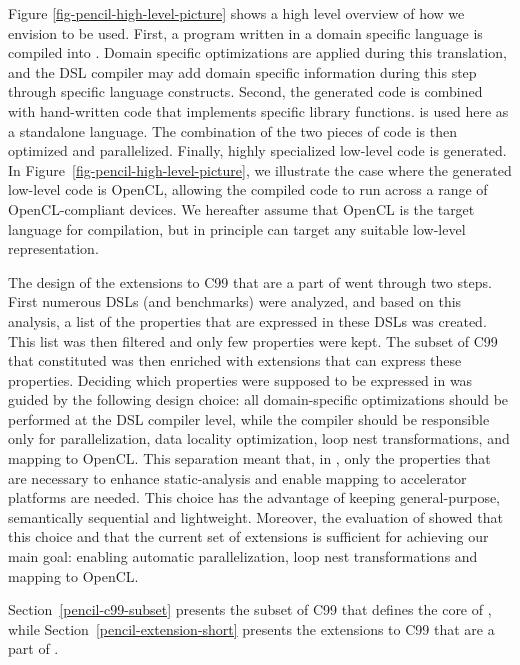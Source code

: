 Figure \ref{fig-pencil-high-level-picture} shows a high level
overview of how we envision \pencil to be used.
First, a program written in a domain
specific language is compiled into \pencil.  Domain specific
optimizations are applied during this translation, and the DSL compiler may
add domain specific information during this step through specific \pencil
language
constructs.  Second, the generated \pencil code is combined with
hand-written \pencil code that implements specific library
functions.  \pencil is used here as a standalone language.  The
combination of the two pieces of code is then optimized and
parallelized.  Finally, 
highly specialized low-level code is generated.
In Figure~\ref{fig-pencil-high-level-picture}, we
illustrate the case where the generated low-level code is OpenCL, 
allowing the compiled code to run across a range of OpenCL-compliant 
devices.  We hereafter assume that OpenCL is the target language for 
\pencil compilation, but in principle \pencil can target any suitable 
low-level representation.

The design of the extensions to C99 that are a part of \pencil went
through two steps.
First numerous DSLs (and benchmarks) were analyzed, and based on this
analysis,  a list of the properties that are expressed in these DSLs
was created.
This list was then filtered and only few properties were kept.
The subset of C99 that constituted \pencil was then enriched with
extensions that can express these properties.
Deciding which properties were supposed to be expressed in \pencil
was guided by the following design choice:
all domain-specific optimizations should be performed at the DSL compiler
level, while the \pencil compiler should be responsible only for parallelization,
data locality optimization, loop nest transformations, and mapping to OpenCL.
This separation meant that, in \pencil, only the properties that are necessary
to enhance static-analysis and enable mapping to accelerator platforms are needed.
This choice has the advantage of keeping \pencil general-purpose,
semantically sequential and lightweight.
Moreover, the evaluation of \pencil showed that this choice and that the
current set of extensions is sufficient for achieving our main goal:
enabling automatic parallelization, loop nest transformations
and mapping to OpenCL.

Section~\ref{pencil-c99-subset} presents the subset of C99 that
defines the core of \pencil, while Section~\ref{pencil-extension-short}
presents the extensions to C99 that are a part of \pencil.

